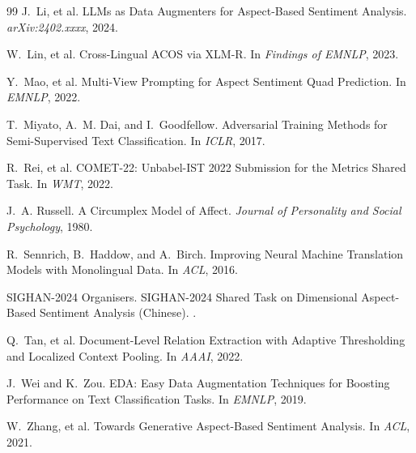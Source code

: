 \documentclass[11pt]{article}
\begin{document}
\begin{thebibliography}{99}
J.~Li, et al.
\newblock LLMs as Data Augmenters for Aspect-Based Sentiment
Analysis.
\newblock \emph{arXiv:2402.xxxx}, 2024.

W.~Lin, et al.
\newblock Cross-Lingual ACOS via XLM-R.
\newblock In \emph{Findings of EMNLP}, 2023.

Y.~Mao, et al.
\newblock Multi-View Prompting for Aspect Sentiment Quad Prediction.
\newblock In \emph{EMNLP}, 2022.

T.~Miyato, A.~M. Dai, and I.~Goodfellow.
\newblock Adversarial Training Methods for Semi-Supervised Text
Classification.
\newblock In \emph{ICLR}, 2017.

R.~Rei, et al.
\newblock COMET-22: Unbabel-IST 2022 Submission for the Metrics
Shared Task.
\newblock In \emph{WMT}, 2022.

J.~A. Russell.
\newblock A Circumplex Model of Affect.
\newblock \emph{Journal of Personality and Social Psychology}, 1980.

R.~Sennrich, B.~Haddow, and A.~Birch.
\newblock Improving Neural Machine Translation Models with
Monolingual Data.
\newblock In \emph{ACL}, 2016.

SIGHAN-2024 Organisers.
\newblock SIGHAN-2024 Shared Task on Dimensional Aspect-Based
Sentiment Analysis (Chinese).
.

Q.~Tan, et al.
\newblock Document-Level Relation Extraction with Adaptive
Thresholding and Localized Context Pooling.
\newblock In \emph{AAAI}, 2022.

J.~Wei and K.~Zou.
\newblock EDA: Easy Data Augmentation Techniques for Boosting
Performance on Text Classification Tasks.
\newblock In \emph{EMNLP}, 2019.

W.~Zhang, et al.
\newblock Towards Generative Aspect-Based Sentiment Analysis.
\newblock In \emph{ACL}, 2021.

\end{thebibliography}
\end{document}
